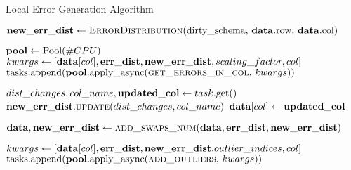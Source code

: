\begin{algorithm}[!t]
    \caption{Local Error Generation Algorithm}\label{alg:local_generator}
    \begin{algorithmic}[1] 
	  \STATE $\mathbf{new\_err\_dist} \leftarrow \text{\textsc{ErrorDistribution}(dirty\_schema, \ensuremath{\mathbf{data}}.row, \ensuremath{\mathbf{data}}.col)}$
	  
	  
	  \STATE $\mathbf{pool} \leftarrow \text{Pool}(\#CPU)$
	   {
	    \STATE $kwargs \leftarrow [\mathbf{data}[col], \mathbf{err\_dist}, \mathbf{new\_err\_dist}, scaling\_factor, col]$ 
        \STATE $\text{tasks.append(\ensuremath{\mathbf{pool}}.apply\_async(\textsc{get\_errors\_in\_col},} \ kwargs\text{))}$ 
      }\ENDFOR 
      
	   {
        \STATE $dist\_changes, col\_name, \mathbf{updated\_col} \leftarrow task\text{.get()}$ 
        \STATE $\mathbf{new\_err\_dist}.\textsc{update}(dist\_changes, col\_name)$ 
        \STATE $\mathbf{data}[col] \leftarrow \mathbf{updated\_col}$ 
      }\ENDFOR 
      
      \STATE $\mathbf{data}, \mathbf{new\_err\_dist} \leftarrow \textsc{add\_swaps\_num}(\mathbf{data}, \mathbf{err\_dist}, \mathbf{new\_err\_dist})$ 
      
      
    
	   {
	    \STATE $kwargs \leftarrow [\mathbf{data}[col], \mathbf{err\_dist}, \mathbf{new\_err\_dist}.outlier\_indices, col]$ 
        \STATE $\text{tasks.append(\mat{pool}.apply\_async(\textsc{add\_outliers},}\ kwargs\text{))}$ 
      }\ENDFOR 
      

\end{algorithmic}
\end{algorithm}
